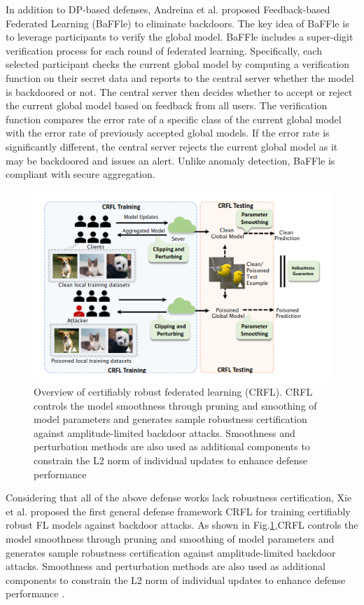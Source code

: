 \documentclass[conference]{IEEEtran}
\begin{document}
In addition to DP-based defenses, Andreina et al. \cite{b85}proposed Feedback-based Federated Learning (BaFFle) to eliminate backdoors.
The key idea of BaFFle is to leverage participants to verify the global model. BaFFle includes a super-digit verification process for each
round of federated learning. Specifically, each selected participant checks the current global model by computing a verification function on
their secret data and reports to the central server whether the model is backdoored or not. The central server then decides whether
to accept or reject the current global model based on feedback from all users. The verification function compares the error rate of
a specific class of the current global model with the error rate of previously accepted global models. If the error rate is significantly different,
the central server rejects the current global model as it may be backdoored and issues an alert. Unlike anomaly detection, BaFFle is compliant with secure aggregation.

\begin{figure}[htbp]
    \centerline{\includegraphics[width=0.8\linewidth,height=0.6\linewidth]{picture/CRFL.png}}
    \caption{Overview of certifiably robust federated learning (CRFL). CRFL controls the model smoothness through pruning and smoothing of model parameters and generates sample robustness
    certification against amplitude-limited backdoor attacks. Smoothness and perturbation methods are also used as 
    additional components to constrain the L2 norm of individual updates to enhance defense performance}
    \label{fig11}
\end{figure}


Considering that all of the above defense works lack robustness certification,
Xie et al. \cite{b86} proposed the first general defense framework CRFL for training certifiably robust FL models against backdoor attacks.
As shown in Fig.\ref{fig11},CRFL controls the model smoothness through pruning and smoothing of model parameters and generates sample robustness
certification against amplitude-limited backdoor attacks. Smoothness and perturbation methods are also used as
additional components to constrain the L2 norm of individual updates to enhance defense performance \cite{b87}.
\end{document}
